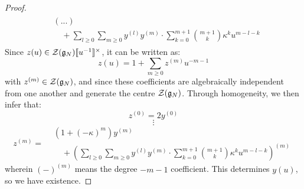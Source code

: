 \begin{proof}
$$\begin{aligned}
\begin{aligned}
                                & (...)
                                \\
                                & \quad + \sum_{l \geq 0} \sum_{m \geq 0} y^{(l)} y^{(m)} \cdot \sum_{k = 0}^{m + 1} \binom{m + 1}{k} \kappa^k u^{m - l - k}
                            \end{aligned}
                        \end{aligned}
                    $$
                Since $z(u) \in \calZ(\g_N)[\![u^{-1}]\!]^{\x}$, it can be written as:
                    $$z(u) = 1 + \sum_{m \geq 0} z^{(m)} u^{-m - 1}$$
                with $z^{(m)} \in \mathcal{Z}(\mathfrak{g}_N)$, and since these coefficients are algebraically independent from one another and generate the centre $\mathcal{Z}(\mathfrak{g}_N)$. Through homogeneity, we then infer that:
                    $$z^{(0)} = 2y^{(0)}$$
                    $$\vdots$$
                    $$
                        z^{(m)} =
                        \begin{aligned}
                            & (1 + (-\kappa)^m) y^{(m)}
                            \\
                            & \quad + \left( \sum_{l \geq 0} \sum_{m \geq 0} y^{(l)} y^{(m)} \cdot \sum_{k = 0}^{m + 1} \binom{m + 1}{k} \kappa^k u^{m - l - k} \right)^{(m)} 
                        \end{aligned}
                    $$
                wherein $(-)^{(m)}$ means the degree $-m - 1$ coefficient. This determines $y(u)$, so we have existence.


\end{proof}
